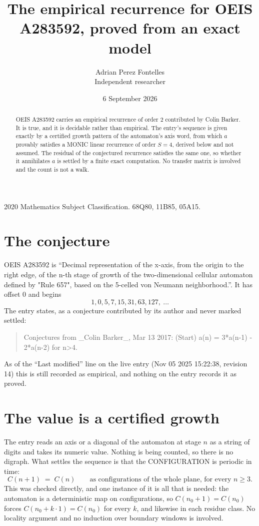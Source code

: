 \documentclass[11pt,a4paper]{article}
\title{The empirical recurrence for OEIS A283592, proved from an exact model}
\author{Adrian Perez Fontelles\\ \small Independent researcher}
\date{6 September 2026}
\theoremstyle{plain}
\theoremstyle{definition}
\begin{document}
\maketitle

\begin{abstract}
OEIS A283592 carries an empirical recurrence of order $2$ contributed by Colin Barker. It is true, and it is
decidable rather than empirical. The entry's sequence is given exactly by a certified growth pattern of the automaton's axis word, from
which $a$ provably satisfies a MONIC linear recurrence of order $S=4$, derived below and not
assumed. The residual of the conjectured recurrence satisfies the same one, so whether it
annihilates $a$ is settled by a finite exact computation. No transfer matrix is involved and
the count is not a walk.
\end{abstract}

\noindent\small 2020 Mathematics Subject Classification. 68Q80, 11B85, 05A15.\normalsize

\section{The conjecture}

OEIS A283592 is ``Decimal representation of the x-axis, from the origin to the right edge, of the n-th stage of growth of the two-dimensional cellular automaton defined by "Rule 657", based on the 5-celled von Neumann neighborhood.''. It has offset $0$ and begins
\[
1, 0, 5, 7, 15, 31, 63, 127,\ \dots
\]
The entry states, as a conjecture contributed by its author and never marked settled:
\begin{quote}
Conjectures from \_Colin Barker\_, Mar 13 2017: (Start) a(n) = 3*a(n-1) - 2*a(n-2) for n>4.
\end{quote}
As of the ``Last modified'' line on the live entry (Nov 05 2025 15:22:38, revision 14)
this is still recorded as empirical, and nothing on the entry records it as proved.

\section{The value is a certified growth}

The entry reads an axis or a diagonal of the automaton at stage $n$ as a string of digits and
takes its numeric value. Nothing is being counted, so there is no digraph. What settles the
sequence is that the CONFIGURATION is periodic in time:
\[
C(n+1)\;=\;C(n)\qquad\text{as configurations of the whole plane, for every } n\ge 3.
\]
This was checked directly, and one instance of it is all that is needed: the automaton is a
deterministic map on configurations, so $C(n_0+1)=C(n_0)$ forces $C(n_0+k\cdot1)=C(n_0)$ for
every $k$, and likewise in each residue class. No locality argument and no induction over
boundary windows is involved.
\end{document}
